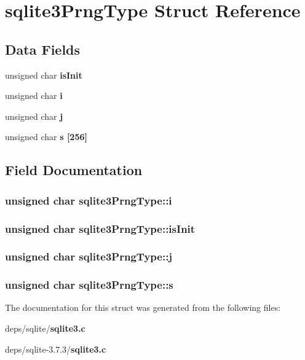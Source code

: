 \section{sqlite3Prng\-Type Struct Reference}
\label{structsqlite3PrngType}
\subsection*{Data Fields}
\begin{CompactItemize}
\item 
unsigned char \bf{is\-Init}
\item 
unsigned char \bf{i}
\item 
unsigned char \bf{j}
\item 
unsigned char \bf{s} [256]
\end{CompactItemize}


\subsection{Field Documentation}
\subsubsection{\setlength{\rightskip}{0pt plus 5cm}unsigned char \bf{sqlite3Prng\-Type::i}}\label{structsqlite3PrngType_bf49d59a1b40fed3a95ec997c156c2bf}


\subsubsection{\setlength{\rightskip}{0pt plus 5cm}unsigned char \bf{sqlite3Prng\-Type::is\-Init}}\label{structsqlite3PrngType_54410b1f67cf3378cc3f76654d5ff0a3}


\subsubsection{\setlength{\rightskip}{0pt plus 5cm}unsigned char \bf{sqlite3Prng\-Type::j}}\label{structsqlite3PrngType_62c1ce0309c4c262895fc22e699e3ba7}


\subsubsection{\setlength{\rightskip}{0pt plus 5cm}unsigned char \bf{sqlite3Prng\-Type::s}}\label{structsqlite3PrngType_e6f8ecbffae1ab45c0592fc1f222b4b8}




The documentation for this struct was generated from the following files:\begin{CompactItemize}
\item 
deps/sqlite/\bf{sqlite3.c}\item 
deps/sqlite-3.7.3/\bf{sqlite3.c}\end{CompactItemize}
